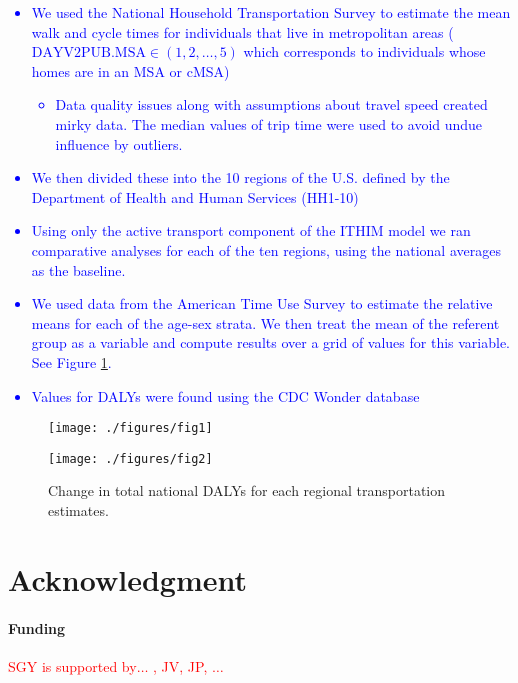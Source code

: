 \documentclass{bioinfo}
\newcommand{\col}[2][red]{\textcolor{#1}{#2}}
\newcommand{\bi}{\begin{itemize}}
\newcommand{\ei}{\end{itemize}}
\begin{document}
\col[blue]{\begin{itemize}
\item We used the National Household Transportation Survey \cite{NHTS} to
  estimate the mean walk and cycle times for individuals that live in
  metropolitan areas ($\textrm{DAYV2PUB.MSA} \in (1,2,\ldots,5)$ which
  corresponds to individuals whose homes are in an MSA or cMSA)
  \bi\item Data quality issues along with assumptions about travel speed
created mirky data.  The median values of trip time were used to avoid
undue influence by outliers.\ei
\item We then divided these into the 10 regions of the U.S. defined by
  the Department of Health and Human Services (HH1-10)
\item Using only the active transport component of the ITHIM model we
  ran comparative analyses for each of the ten regions, using the
  national averages as the baseline.
\item We used data from the American Time Use Survey \cite{ATUS} to
  estimate the relative means for each of the age-sex strata.  We then
  treat the mean of the referent group as a variable and compute
  results over a grid of values for this variable.  See Figure
  \ref{dalyFigure}.
\item Values for DALYs were found using the CDC Wonder database \cite{CDCWonder}
\end{itemize}}


\begin{figure}[t]
    \centerline{\texttt{[image: ./figures/fig1]}}
    \centerline{\texttt{[image: ./figures/fig2]}}
    \caption{Change in total national DALYs for each regional
      transportation estimates.}\label{dalyFigure}
\end{figure}

\section*{Acknowledgment}
\paragraph{Funding\textcolon} \col[red]{SGY is supported by$\ldots$ , JV, JP, $\ldots$}

%

%

\end{document}
